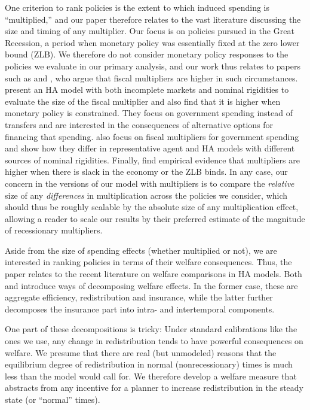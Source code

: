 \documentclass[\econtexRoot/HAFiscal]{subfiles}
\begin{document}
One criterion to rank policies is the extent to which induced spending is ``multiplied,'' and our paper therefore relates to the vast literature discussing the size and timing of any multiplier. 
Our focus is on policies pursued in the Great Recession, a period when monetary policy was essentially fixed at the zero lower bound (ZLB). 
We therefore do not consider monetary policy responses to the policies we evaluate in our primary analysis, and our work thus relates to papers such as \cite{christiano2011government} and \cite{eggertsson2011fiscal}, who argue that fiscal multipliers are higher in such circumstances. 
\cite{hagedorn2019fiscal} present an HA model with both incomplete markets and nominal rigidities to evaluate the size of the fiscal multiplier and also find that it is higher when monetary policy is constrained.  They focus on government spending instead of transfers and are interested in the consequences of alternative options for financing that spending. 
\cite{broer2023fiscalmultipliers} also focus on fiscal multipliers for government spending and show how they differ in representative agent and HA models with different sources of nominal rigidities. 
Finally, \cite{ramey2018government} find empirical evidence that multipliers are higher when there is slack in the economy or the ZLB binds.  %
In any case, our concern in the versions of our model with multipliers is to compare the \textit{relative} size of any \textit{differences} in multiplication across the policies we consider, which should thus be roughly scalable by the absolute size of any multiplication effect, allowing a reader to scale our results by their preferred estimate of the magnitude of recessionary multipliers.

Aside from the size of spending effects (whether multiplied or not), we are interested in ranking policies in terms of their welfare consequences.  Thus, the paper relates to the recent literature on welfare comparisons in HA models. 
Both \cite{bhandari2021efficiency} and \cite{davila2022welfare} introduce ways of decomposing welfare effects. 
In the former case, these are aggregate efficiency, redistribution and insurance, while the latter further decomposes the insurance part into intra- and intertemporal components.

One part of these decompositions is tricky: Under standard calibrations like the ones we use, any change in redistribution tends to have powerful consequences on welfare.  We presume that there are real (but unmodeled) reasons that the equilibrium degree of redistribution in normal (nonrecessionary) times is much less than the model would call for.  We therefore develop a welfare measure that abstracts from any incentive for a planner to increase redistribution in the steady state (or ``normal'' times).
\end{document}
